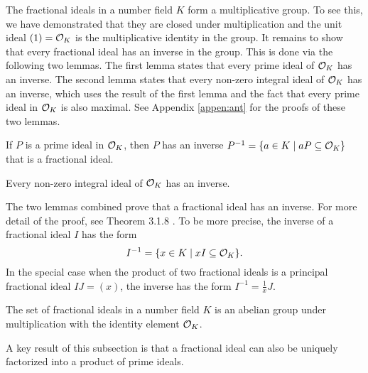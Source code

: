 \documentclass[../main.tex]{subfiles}
\begin{document}
The fractional ideals in a number field $K$ form a multiplicative group. To see this, we have demonstrated that they are closed under multiplication and the unit ideal $(1)=\mathcal{O}_K$ is the multiplicative identity in the group. It remains to show that every fractional ideal has an inverse in the group. This is done via the following two lemmas. The first lemma states that every prime ideal of $\mathcal{O}_K$ has an inverse. The second lemma states that every non-zero integral ideal of $\mathcal{O}_K$ has an inverse, which uses the result of the first lemma and the fact that every prime ideal in $\mathcal{O}_K$ is also maximal. See Appendix \ref{appen:ant} for the proofs of these two lemmas. 

\begin{lemma}
If $P$ is a prime ideal in $\mathcal{O}_K$, then $P$ has an inverse $P^{-1} = \{a \in K \mid a P \subseteq \mathcal{O}_K\}$ that is a fractional ideal.
\end{lemma}

\begin{lemma}
Every non-zero integral ideal of $\mathcal{O}_K$ has an inverse. 
\end{lemma}

The two lemmas combined prove that a fractional ideal has an inverse. For more detail of the proof, see Theorem 3.1.8 \citep{stein2012algebraic}. To be more precise, the inverse 
\reversemarginpar
{}
of a fractional ideal $I$ has the form 
\begin{equation}
\label{equ:fracIdInv}
    I^{-1} = \{x \in K \mid xI \subseteq \mathcal{O}_K\}.
\end{equation}
In the special case when the product of two fractional ideals is a principal fractional ideal $IJ=(x)$, the inverse has the form $I^{-1}=\frac{1}{x}J$.

\begin{theorem}
\label{thm:fracIdealGroup}
\reversemarginpar
{}
The set of fractional ideals in a number field $K$ is an abelian group under multiplication with the identity element $\mathcal{O}_K$. 
\end{theorem}

A key result of this subsection is that a fractional ideal can also be uniquely factorized into a product of prime ideals. 
\end{document}
